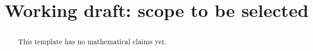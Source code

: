 \documentclass[11pt]{article}
\title{Working draft: scope to be selected}
\author{}
\date{}
\theoremstyle{remark}
\begin{document}
\maketitle
\begin{abstract}
This template has no mathematical claims yet.
\end{abstract}




\end{document}
